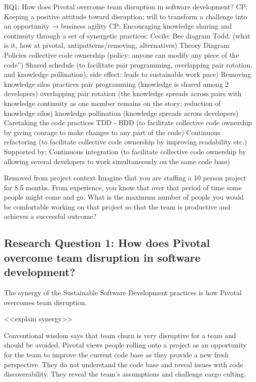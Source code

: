 \begin{table}[]
RQ1: How does Pivotal overcome team disruption in software development?
CP: Keeping a positive attitude toward disruption; will to transform a challenge into an opportunity → business agility
CP: Encouraging knowledge sharing and continuity through a set of synergetic practices:
Cecile: Bee diagram
Todd: (what is it, how at pivotal, antipatterns/removing, alternatives)
Theory Diagram
Policies
collective code ownership (policy: anyone can modify any piece of the code”)
Shared schedule (to facilitate pair programming, overlapping pair rotation, and knowledge pollination); side effect: leads to sustainable work pace)
Removing knowledge silos practices
pair programming (knowledge is shared among 2 developers)
overlapping pair rotation (the knowledge spreads across pairs with knowledge continuity as one member remains on the story; reduction of knowledge silos)
knowledge pollination (knowledge spreads across developers)
Caretaking the code practices
TDD - BDD (to facilitate collective code ownership by giving courage to make changes to any part of the code)
Continuous refactoring (to facilitate collective code ownership by improving readability etc.)
Supported by: Continuous integration (to facilitate collective code ownership by allowing several developers to work simultaneously on the same code base)



Removed from project context
Imagine that you are staffing a 10 person project for 8.5 months. From experience, you know that over that period of time some people might come and go. What is the maximum number of people you would be comfortable working on that project so that the team is productive and achieves a successful outcome?  


\subsection{Research Question 1: How does Pivotal overcome team disruption in software development?}
The synergy of the Sustainable Software Development practices is how Pivotal overcomes team disruption.

<<explain synergy>>

Conventional wisdom says that team churn is very disruptive for a team and should be avoided. 
Pivotal views people rolling onto a project as an opportunity for the team to improve the current code base as they provide a new fresh perspective. They do not understand the code base and  reveal issues with code discoverability. They reveal the team's assumptions and challenge cargo culting. 


\end{table}
